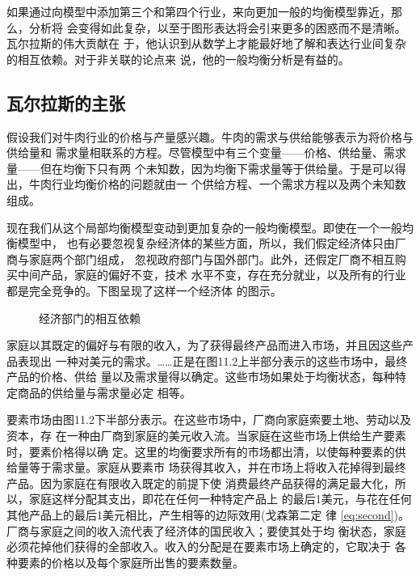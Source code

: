 如果通过向模型中添加第三个和第四个行业，来向更加一般的均衡模型靠近，那么，分析将
会变得如此复杂，以至于图形表达将会引来更多的困惑而不是清晰。瓦尔拉斯的伟大贡献在
于，他认识到从数学上才能最好地了解和表达行业间复杂的相互依赖。对于非关联的论点来
说，他的一般均衡分析是有益的。

\subsection{瓦尔拉斯的主张}

假设我们对牛肉行业的价格与产量感兴趣。牛肉的需求与供给能够表示为将价格与供给量和
需求量相联系的方程。尽管模型中有三个变量——价格、供给量、需求量——但在均衡下只有两
个未知数，因为均衡下需求量等于供给量。于是可以得出，牛肉行业均衡价格的问题就由一
个供给方程、一个需求方程以及两个未知数组成。

现在我们从这个局部均衡模型变动到更加复杂的一般均衡模型。即使在一个一般均衡模型中，
也有必要忽视复杂经济体的某些方面，所以，我们假定经济体只由厂商与家庭两个部门组成，
忽视政府部门与国外部门。此外，还假定厂商不相互购买中间产品，家庭的偏好不变，技术
水平不变，存在充分就业，以及所有的行业都是完全竞争的。下图呈现了这样一个经济体
的图示。
\begin{figure}[ht]
  \centering
  \caption{\label{fig:interdepend}经济部门的相互依赖}
\end{figure}

家庭以其既定的偏好与有限的收入，为了获得最终产品而进入市场，并且因这些产品表现出
一种对美元的需求。……正是在图11.2上半部分表示的这些市场中，最终产品的价格、供给
量以及需求量得以确定。这些市场如果处于均衡状态，每种特定商品的供给量与需求量必定
相等。

要素市场由图11.2下半部分表示。在这些市场中，厂商向家庭索要土地、劳动以及资本，存
在一种由厂商到家庭的美元收入流。当家庭在这些市场上供给生产要素时，要素价格得以确
定。这里的均衡要求所有的市场都出清，以使每种要素的供给量等于需求量。家庭从要素市
场获得其收入，并在市场上将收入花掉得到最终产品。因为家庭在有限收入既定的前提下使
消费最终产品获得的满足最大化，所以，家庭这样分配其支出，即花在任何一种特定产品上
的最后1美元，与花在任何其他产品上的最后1美元相比，产生相等的边际效用(戈森第二定
律 \cref{eq:second})。厂商与家庭之间的收入流代表了经济体的国民收入；要使其处于均
衡状态，家庭必须花掉他们获得的全部收入。收入的分配是在要素市场上确定的，它取决于
各种要素的价格以及每个家庭所出售的要素数量。

